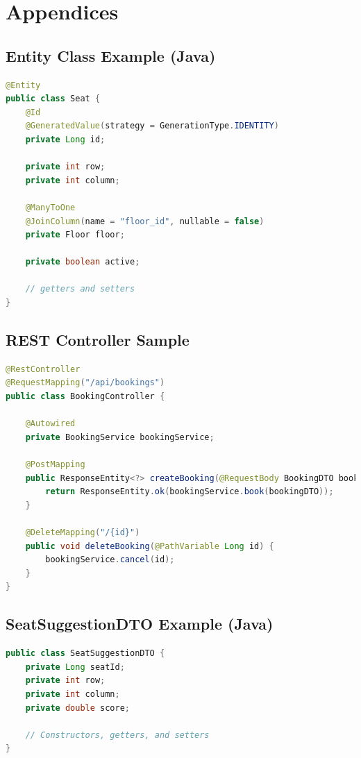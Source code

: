 \documentclass[12pt,a4paper]{report} %
\begin{document}
\newpage

\appendix
\chapter*{Appendices}
\section*{Entity Class Example (Java)}
\label{appendix:entity}

\begin{lstlisting}[language=Java, caption=Seat Entity (Java), label=lst:seat-entity]
@Entity
public class Seat {
    @Id
    @GeneratedValue(strategy = GenerationType.IDENTITY)
    private Long id;

    private int row;
    private int column;

    @ManyToOne
    @JoinColumn(name = "floor_id", nullable = false)
    private Floor floor;

    private boolean active;

    // getters and setters
}
\end{lstlisting}

\section*{REST Controller Sample}
\label{appendix:controller}

\begin{lstlisting}[language=Java, caption=Booking Controller (Java), label=lst:booking-controller]
@RestController
@RequestMapping("/api/bookings")
public class BookingController {

    @Autowired
    private BookingService bookingService;

    @PostMapping
    public ResponseEntity<?> createBooking(@RequestBody BookingDTO bookingDTO) {
        return ResponseEntity.ok(bookingService.book(bookingDTO));
    }

    @DeleteMapping("/{id}")
    public void deleteBooking(@PathVariable Long id) {
        bookingService.cancel(id);
    }
}
\end{lstlisting}

\section*{SeatSuggestionDTO Example (Java)}
\label{appendix:seatdto}

\begin{lstlisting}[language=Java, caption=SeatSuggestionDTO (Java), label=lst:seat-suggestion-dto]
public class SeatSuggestionDTO {
    private Long seatId;
    private int row;
    private int column;
    private double score;

    // Constructors, getters, and setters
}
\end{lstlisting}
\end{document}
